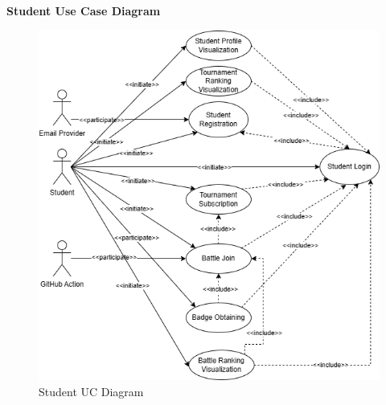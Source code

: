 \newpage

\textbf{Student Use Case Diagram}
\begin{figure}[H]
    \centering
    \includegraphics[width=1\linewidth]{Images/UC_Student.png}
    \caption{Student UC Diagram}
    \label{fig:uc_student}
\end{figure}

\newpage

